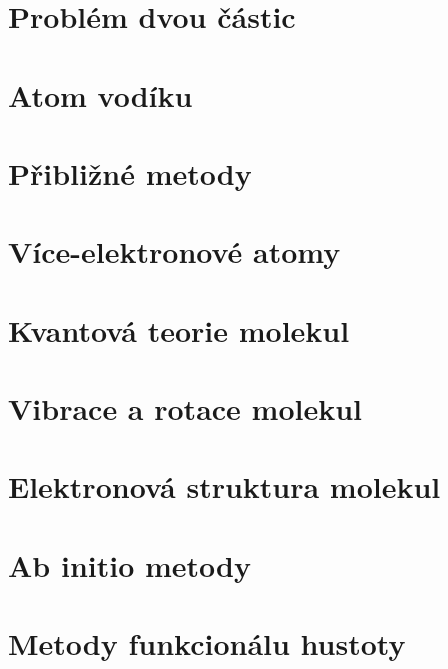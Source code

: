 \documentclass[a4paper,12pt]{article}
\numberwithin{equation}{section} %
\begin{document}
\clearpage
\section{Problém dvou částic}
\label{kap:dvecastice}


\clearpage
\section{Atom vodíku}
\label{kap:vodik}


\clearpage
\section{Přibližné metody}
\label{kap:pribliznemetody}


\clearpage
\section{Více-elektronové atomy}
\label{kap:viceelektron}


\clearpage
\section{Kvantová teorie molekul}
\label{kap:molekuly}


\clearpage
\section{Vibrace a rotace molekul}
\label{kap:vibrot}


\clearpage
\section{Elektronová struktura molekul}
\label{kap:elstruktmol}


\clearpage
\section{Ab initio metody}
\label{kap:abinitio}


\clearpage
\section{Metody funkcionálu hustoty}
\label{sec:dft}

\end{document}
